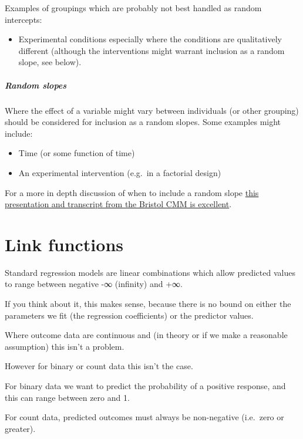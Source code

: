 \documentclass[]{article}
\providecommand{\tightlist}{%
  \setlength{\itemsep}{0pt}\setlength{\parskip}{0pt}}
\let\oldsubparagraph\subparagraph
\renewcommand{\subparagraph}[1]{\oldsubparagraph{#1}\mbox{}}
\theoremstyle{definition}
\theoremstyle{definition}
\theoremstyle{definition}
\theoremstyle{remark}
\begin{document}
Examples of groupings which are probably not best handled as random
intercepts:

\begin{itemize}
\tightlist
\item
  Experimental conditions especially where the conditions are
  qualitatively different (although the interventions might warrant
  inclusion as a random slope, see below).
\end{itemize}

\hypertarget{random-slopes}{\subparagraph{Random
slopes}\label{random-slopes}}

Where the effect of a variable might vary between individuals (or other
grouping) should be considered for inclusion as a random slopes. Some
examples might include:

\begin{itemize}
\tightlist
\item
  Time (or some function of time)
\item
  An experimental intervention (e.g.~in a factorial design)
\end{itemize}

For a more in depth discussion of when to include a random slope
\href{http://www.bristol.ac.uk/cmm/learning/videos/random-slopes.html}{this
presentation and transcript from the Bristol CMM is excellent}.

\hypertarget{link-functions}{\section{Link
functions}\label{link-functions}}

Standard regression models are linear combinations which allow predicted
values to range between negative -∞ (infinity) and +∞.

If you think about it, this makes sense, because there is no bound on
either the parameters we fit (the regression coefficients) or the
predictor values.

Where outcome data are continuous and (in theory or if we make a
reasonable assumption) this isn't a problem.

However for binary or count data this isn't the case.

For binary data we want to predict the probability of a positive
response, and this can range between zero and 1.

For count data, predicted outcomes must always be non-negative
(i.e.~zero or greater).
\end{document}
